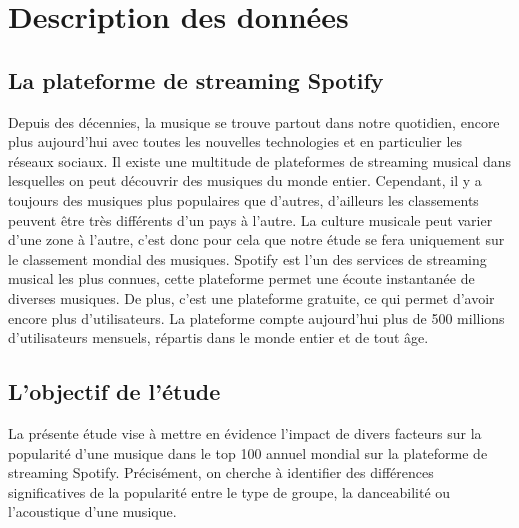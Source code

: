 \documentclass[french,]{compterendu}
\theoremstyle{urcastyle}
\theoremstyle{remark}
\begin{document}
% 

\newpage

  {
  \hypersetup{linkcolor=black}
  \setcounter{tocdepth}{2}
  \tableofcontents
  }

\pagebreak
\normalsize



\hypertarget{description-des-donnuxe9es}{%
\section{Description des données}\label{description-des-donnuxe9es}}

\hypertarget{la-plateforme-de-streaming-spotify}{%
\subsection{La plateforme de streaming Spotify}\label{la-plateforme-de-streaming-spotify}}

Depuis des décennies, la musique se trouve partout dans notre quotidien, encore plus aujourd'hui avec toutes les nouvelles technologies et en particulier les réseaux sociaux. Il existe une multitude de plateformes de streaming musical dans lesquelles on peut découvrir des musiques du monde entier. Cependant, il y a toujours des musiques plus populaires que d'autres, d'ailleurs les classements peuvent être très différents d'un pays à l'autre. La culture musicale peut varier d'une zone à l'autre, c'est donc pour cela que notre étude se fera uniquement sur le classement mondial des musiques. Spotify est l'un des services de streaming musical les plus connues, cette plateforme permet une écoute instantanée de diverses musiques. De plus, c'est une plateforme gratuite, ce qui permet d'avoir encore plus d'utilisateurs. La plateforme compte aujourd'hui plus de 500 millions d'utilisateurs mensuels, répartis dans le monde entier et de tout âge.

\hypertarget{lobjectif-de-luxe9tude}{%
\subsection{L'objectif de l'étude}\label{lobjectif-de-luxe9tude}}

La présente étude vise à mettre en évidence l'impact de divers facteurs sur la popularité d'une musique dans le top 100 annuel mondial sur la plateforme de streaming Spotify. Précisément, on cherche à identifier des différences significatives de la popularité entre le type de groupe, la danceabilité ou l'acoustique d'une musique.
\end{document}
